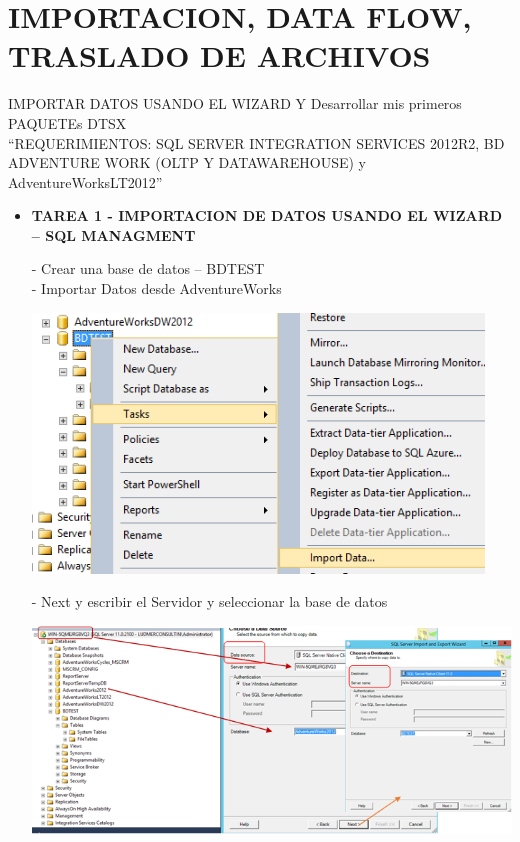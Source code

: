 \section{IMPORTACION, DATA FLOW, TRASLADO DE ARCHIVOS} 

IMPORTAR DATOS USANDO EL WIZARD Y Desarrollar mis primeros PAQUETEs DTSX\\
“REQUERIMIENTOS: SQL SERVER INTEGRATION SERVICES 2012R2, BD ADVENTURE WORK (OLTP Y DATAWAREHOUSE) y AdventureWorksLT2012”

\begin{itemize}
    \item \textbf{TAREA 1 - IMPORTACION DE DATOS USANDO EL WIZARD – SQL MANAGMENT}

- Crear una base de datos – BDTEST\\
- Importar Datos desde AdventureWorks\\

	\begin{center}
	\includegraphics[width=12cm]{./Imagenes/1}
	\end{center}	

- Next y escribir el Servidor y seleccionar la base de datos

	\begin{center}
	\includegraphics[width=17cm]{./Imagenes/2}
	\end{center}	


\end{itemize}
